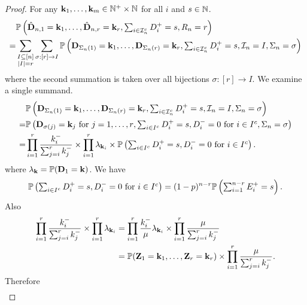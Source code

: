 \begin{proof}
    For any $\vk_1, \ldots, \vk_m \in \N^+ \times \N$ for all $i$ and $s \in \N$.
    \begin{align*}
        & \P\left(\hat{\vD}_{n, 1} = \vk_1, \ldots, \hat{\vD}_{n, r} = \vk_r, \textstyle \sum_{i \in \cI_n^c} D_i^+ = s, R_n = r \right) \\
        =& \sum_{\substack{I \subset [n] \\ \abs{I} = r}} \sum_{\sigma: [r] \to I}
        \P\left(\vD_{\Sigma_n(1)} = \vk_1, \ldots, \vD_{\Sigma_n(r)} = \vk_r, \textstyle \sum_{i \in \cI_n^c} D_i^+ = s, \cI_n = I, \Sigma_n = \sigma \right)
    \end{align*}
    where the second summation is taken over all bijections $\sigma: [r] \to I$. We examine a single summand.
    \begin{align*}
        &\P\left(\vD_{\Sigma_n(1)} = \vk_1, \ldots, \vD_{\Sigma_n(r)} = \vk_r, \textstyle \sum_{i \in \cI_n^c} D_i^+ = s, \cI_n = I, \Sigma_n = \sigma \right) \\
        =&\P\left(
            \vD_{\sigma(j)} = \vk_j\ \text{for $j = 1, \ldots, r$},
            \textstyle \sum_{i \in I^c} D_i^+ = s,
            D^-_i = 0\ \text{for $i \in I^c$},
            \Sigma_n = \sigma
            \right)  \\
        =& \prod_{i=1}^r \frac{k_i^-}{\sum_{j=i}^r k_j^-}
        \times \prod_{i=1}^r \lambda_{\vk_i}
        \times \P\left( 
            \textstyle \sum_{i \in I^c} D_i^+ = s,
            D^-_i = 0\ \text{for $i \in I^c$}
         \right).
    \end{align*}
    where $\lambda_{\vk} = \P(\vD_1 = \vk)$. We have
    \begin{equation*}
        \P\left( 
            \textstyle \sum_{i \in I^c} D_i^+ = s,
            D^-_i = 0\ \text{for $i \in I^c$}
         \right)
         = (1-p)^{n-r} \P\left( 
             \textstyle \sum_{i=1}^{n-r} E^+_i = s
          \right).
    \end{equation*}
    Also
    \begin{align*}
        \prod_{i=1}^r \frac{k_i^-}{\sum_{j=i}^r k_j^-} \times \prod_{i=1}^r \lambda_{\vk_i}
        &= \prod_{i=1}^r \frac{k_i^-}{\mu} \lambda_{\vk_i} \times \prod_{i=1}^r \frac{\mu}{\sum_{j=i}^r k_j^-} \\
        &= \P(\vZ_1 = \vk_1, \ldots, \vZ_r = \vk_r)
        \times \prod_{i=1}^r \frac{\mu}{\sum_{j=i}^r k_j^-}.
    \end{align*}
    Therefore
    \begin{align*}

\end{align*}
\end{proof}
